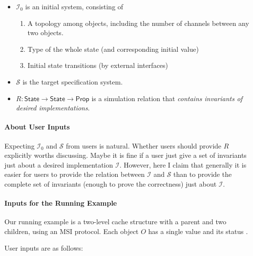 \documentclass[format=manuscript]{acmart}
\begin{document}
\begin{itemize}
\item $\mathcal{I}_0$ is an initial system, consisting of
  \begin{enumerate}
  \item A topology among objects, including the number of channels between any
    two objects.
  \item Type of the whole state (and corresponding initial value)
  \item Initial state transitions (by external interfaces)
  \end{enumerate}
\item $\mathcal{S}$ is the target specification system.
\item $R: \textsf{State} \to \textsf{State} \to \textsf{Prop}$ is a simulation
  relation that \emph{contains invariants of desired implementations}.
\end{itemize}

\paragraph{About User Inputs}
Expecting $\mathcal{I}_0$ and $\mathcal{S}$ from users is natural. Whether users
should provide $R$ explicitly worths discussing. Maybe it is fine if a user just
give a set of invariants just about a desired implementation
$\mathcal{I}$. However, here I claim that generally it is easier for users to
provide the relation between $\mathcal{I}$ and $\mathcal{S}$ than to provide the
complete set of invariants (enough to prove the correctness) just about
$\mathcal{I}$.

\paragraph{Inputs for the Running Example}
Our running example is a two-level cache structure with a parent and two
children, using an MSI protocol. Each object $O$ has a single value 
and its status .

User inputs are as follows:
\end{document}
